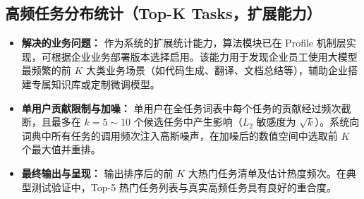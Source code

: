 \subsection{高频任务分布统计（Top-K Tasks，扩展能力）}
\begin{itemize}[leftmargin=2em]
  \item \textbf{解决的业务问题：} 作为系统的扩展统计能力，算法模块已在 Profile 机制层实现，可根据企业业务部署版本选择启用。该能力用于发现企业员工使用大模型最频繁的前 $K$ 大类业务场景（如代码生成、翻译、文档总结等），辅助企业搭建专属知识库或定制微调模型。
  \item \textbf{单用户贡献限制与加噪：} 单用户在全任务词表中每个任务的贡献经过频次截断，且最多在 $k=5 \sim 10$ 个候选任务中产生影响（$L_2$ 敏感度为 $\sqrt{k}$）。系统向词典中所有任务的调用频次注入高斯噪声，在加噪后的数值空间中选取前 $K$ 个最大值并重排。
  \item \textbf{最终输出与呈现：} 输出排序后的前 $K$ 大热门任务清单及估计热度频次。在典型测试验证中，Top-5 热门任务列表与真实高频任务具有良好的重合度。
\end{itemize}
